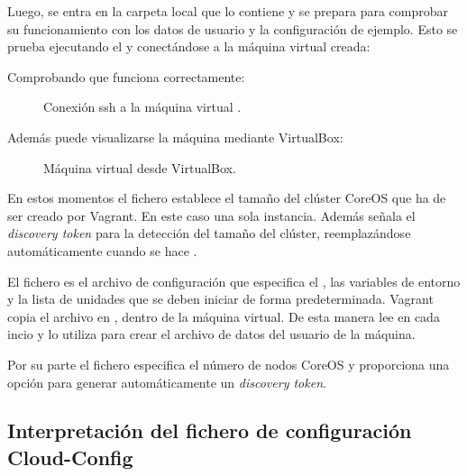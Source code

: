 Luego, se entra en la carpeta local que lo contiene y se prepara para comprobar su funcionamiento con los datos de usuario y la configuración de ejemplo. Esto se prueba ejecutando el  y conectándose a la máquina virtual creada: 


Comprobando que funciona correctamente:

\begin{figure}[H]
\caption{Conexión ssh a la máquina virtual .\label{fig:figure_placement_example}}
\end{figure}

Además puede visualizarse la máquina mediante VirtualBox:

\begin{figure}[H]
\caption{Máquina virtual  desde VirtualBox.\label{fig:figure_placement_example}}
\end{figure}

En estos momentos el fichero  establece el tamaño del clúster CoreOS que ha de ser creado por Vagrant. En este caso una sola instancia. Además señala el \textit{discovery token} para la detección del tamaño del clúster, reemplazándose automáticamente cuando se hace .

El fichero  es el archivo de configuración  que especifica el , las variables de entorno y la lista de unidades que se deben iniciar de forma predeterminada. Vagrant copia el archivo  en , dentro de la máquina virtual. De esta manera  lee  en cada incio y lo utiliza para crear el archivo de datos del usuario de la máquina.

Por su parte el fichero  especifica el número de nodos CoreOS y proporciona una opción para generar automáticamente un \textit{discovery token}.

\subsection{Interpretación del fichero de configuración Cloud-Config}

